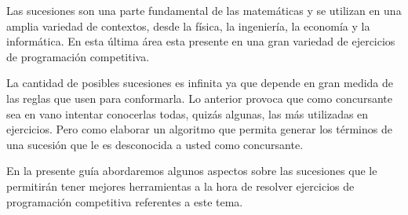 Las sucesiones son una parte fundamental de las matemáticas y se utilizan en una amplia variedad de contextos, desde la física, la ingeniería, la economía y la informática. En esta última área esta presente en una gran variedad de ejercicios de programación competitiva. 

La cantidad de posibles sucesiones es infinita ya que depende en gran medida de las reglas que usen para conformarla. Lo anterior provoca que como concursante sea en vano intentar conocerlas todas, quizás algunas, las más utilizadas en ejercicios. Pero como elaborar un algoritmo que permita generar los términos de una sucesión que le es desconocida a usted como concursante. 

En  la presente guía abordaremos algunos aspectos sobre las sucesiones que le permitirán tener mejores herramientas a la hora de resolver ejercicios de programación competitiva referentes a este tema.  